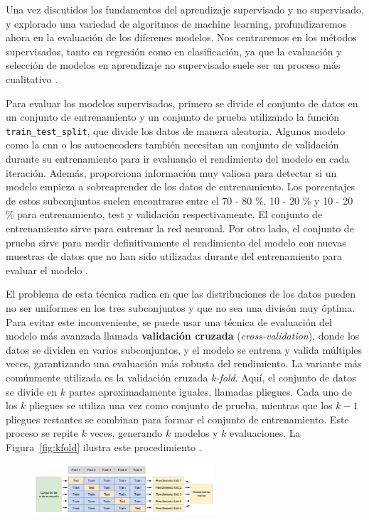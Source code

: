 Una vez discutidos los fundamentos del aprendizaje supervisado y no supervisado, y explorado una variedad de algoritmos de machine learning, profundizaremos ahora en la evaluación de los diferenes modelos. Nos centraremos en los métodos supervisados, tanto en regresión como en clasificación, ya que la evaluación y selección de modelos en aprendizaje no supervisado suele ser un proceso más cualitativo \citep{muller2016introduction}. 


Para evaluar los modelos supervisados, primero se divide el conjunto de datos en un conjunto de entrenamiento y un conjunto de prueba utilizando la función \lstinline|train_test_split|, que divide los datos de manera aleatoria. Algunos modelo como la \acrshort{cnn} o los autoencoders también necesitan un conjunto de validación durante su entrenamiento para ir evaluando el rendimiento del modelo en cada iteración. Además, proporciona información muy valiosa para detectar si un modelo empieza a sobreaprender de los datos de entrenamiento. Los porcentajes de estos subconjuntos suelen encontrarse entre el 70 - 80 \%, 10 - 20 \% y 10 - 20 \% para entrenamiento, test y validación respectivamente. El conjunto de entrenamiento sirve para entrenar la red neuronal. Por otro lado, el conjunto de prueba sirve para medir definitivamente el rendimiento del modelo con nuevas muestras de datos que no han sido utilizadas durante del entrenamiento para evaluar el modelo \citep{muller2016introduction}.


El problema de esta técnica radica en que las distribuciones de los datos pueden no ser uniformes en los tres subconjuntos y que no sea una divisón muy óptima. Para evitar este inconveniente, se puede usar una técnica de evaluación del modelo más avanzada llamada \textbf{validación cruzada} (\textit{cross-validation}), donde los datos se dividen en varios subconjuntos, y el modelo se entrena y valida múltiples veces, garantizando una evaluación más robusta del rendimiento. La variante más comúnmente utilizada es la validación cruzada \textit{k-fold}. Aquí, el conjunto de datos se divide en $k$ partes aproximadamente iguales, llamadas pliegues. Cada uno de los $k$ pliegues se utiliza una vez como conjunto de prueba, mientras que los $k-1$ pliegues restantes se combinan para formar el conjunto de entrenamiento. Este proceso se repite $k$ veces, generando $k$ modelos y $k$ evaluaciones. La Figura~\ref{fig:kfold} ilustra este procedimiento \citep{muller2016introduction}.

\begin{figure}[h]
	\centering
    \includegraphics[width=0.6\textwidth]{img/kfold.png}
    \label{img: k-fold}
\end{figure}

